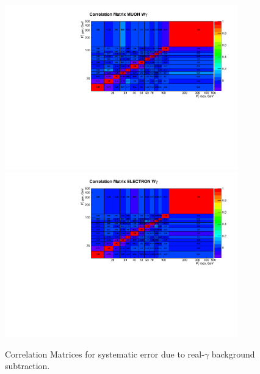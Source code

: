 \begin{figure}[htb]
  \begin{center}
   \includegraphics[width=0.90\textwidth]{../figs/figs_v11/MUON_WGamma/Constants/matrCorrelation_syst_real_g_bkg_subtr.pdf}\\
\includegraphics[width=0.90\textwidth]{../figs/figs_v11/ELECTRON_WGamma/Constants/matrCorrelation_syst_real_g_bkg_subtr.pdf}
  \caption{Correlation Matrices for systematic error due to real-$\gamma$ background subtraction.}
  \label{fig:corrMatrices_syst_real_g_bkg_subtr_Wg}
  \end{center}
\end{figure}

